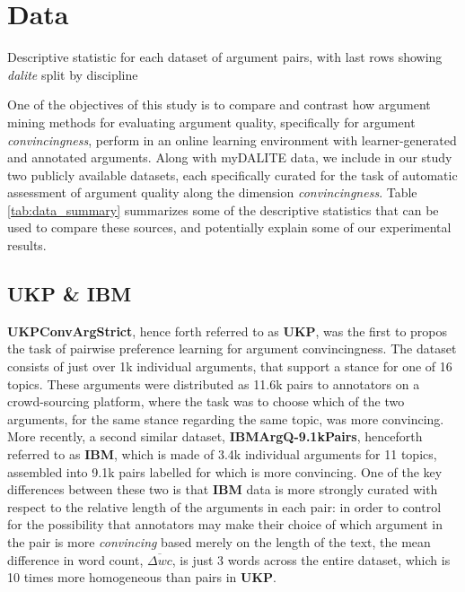 \documentclass[runningheads]{llncs}
\begin{document}
\section{Data}

\begin{table}
	\caption{Descriptive statistic for each dataset of argument pairs, with 
		last rows showing \textit{dalite} split by discipline}
	
	\label{tab:data_summary}
\end{table}

One of the objectives of this study is to compare and contrast how argument 
mining methods for evaluating argument quality, specifically for argument 
\textit{convincingness}, perform in an online learning environment with 
learner-generated and annotated arguments. Along with myDALITE data, we include 
in our study two publicly 
available datasets, each specifically curated for the task of automatic 
assessment of argument quality along the dimension \textit{convincingness}. 
Table \ref{tab:data_summary} summarizes some of the descriptive statistics that 
can be used to compare these sources, and potentially explain some of our 
experimental results.

\subsection{UKP \& IBM}
\textbf{UKPConvArgStrict}\cite{habernal_which_2016}, hence forth referred to as 
\textbf{UKP}, was the first to propos the task of pairwise preference learning 
for argument convincingness. The dataset consists of just over 1k individual 
arguments, that support a stance for one of 16 topics. These arguments were 
distributed as 11.6k pairs to annotators on a crowd-sourcing platform, where 
the task was to choose which of the two arguments, for the same stance 
regarding the same topic, was more convincing. More recently, a second similar 
dataset, \textbf{IBMArgQ-9.1kPairs}\cite{toledo_automatic_2019}, henceforth 
referred to as \textbf{IBM}, which is made of 3.4k individual arguments for 11 
topics, assembled into 9.1k pairs labelled for which is more convincing. One of 
the key differences between these two is that \textbf{IBM} data is more 
strongly curated with respect to the relative length of the arguments in each 
pair: in order to control for the possibility that annotators may make their 
choice of which argument in the pair is more \textit{convincing} based merely 
on the length of the text, the mean difference in word count, $\overline{\Delta 
wc}$, is just 3 words across the entire dataset, which is 10 times more 
homogeneous than pairs in \textbf{UKP}.
\end{document}
